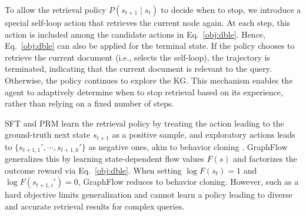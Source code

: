 To allow the retrieval policy $P(s_{t+1}\mid s_{t})$ to decide when to stop, we introduce a special self-loop action that retrieves the current node again. 
At each step, this action is included among the candidate actions in Eq.~\ref{obj:dble}.
Hence, Eq.~\ref{obj:dble} can also be applied for the terminal state.
If the policy chooses to retrieve the current document (i.e., selects the self-loop), the trajectory is terminated, indicating that the current document is relevant to the query. Otherwise, the policy continues to explore the KG. 
This mechanism enables the agent to adaptively determine when to stop retrieval based on its experience, rather than relying on a fixed number of steps.


SFT and PRM learn the retrieval policy by treating the action leading to the ground-truth next state $s_{t+1}$ as a positive sample, and exploratory actions leads to $\{s_{t+1,1}', \cdots, s_{t+1,k}'\}$ as negative ones, akin to behavior cloning \cite{torabi2018behavioral}. 
GraphFlow generalizes this by learning state-dependent flow values $F(s)$ and factorizes the outcome reward via Eq.~\ref{obj:dble}. 
When setting $\log F(s_t) = 1$ and $\log F(s_{t+1,i}') = 0$, GraphFlow reduces to behavior cloning. 
However, such as a hard objective limits generalization and cannot learn a policy leading to diverse and accurate retrieval results for complex queries. 
